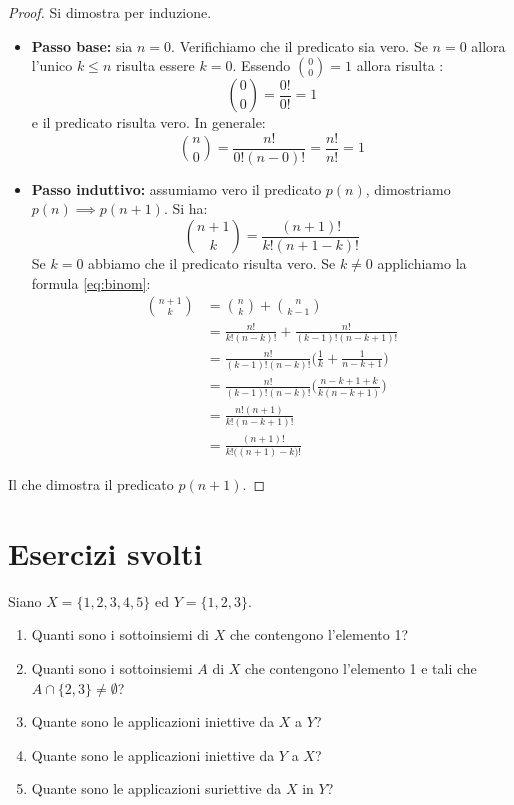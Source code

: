 \begin{proof}
	Si dimostra per induzione.
	\begin{itemize}
		\item \textbf{Passo base:} sia $n=0$. Verifichiamo che il predicato sia vero. Se $n=0$ allora l'unico $k\leq n$ risulta essere $k=0$. Essendo $\binom{0}{0}=1$ allora  risulta :
		\begin{displaymath}
			\binom{0}{0} = \frac{0!}{0!} = 1
		\end{displaymath}
		e il predicato risulta vero. In generale:
		\begin{displaymath}
			\binom{n}{0} = \frac{n!}{0!(n-0)!} = \frac{n!}{n!} = 1
		\end{displaymath}
		\item \textbf{Passo induttivo:} assumiamo vero il predicato $p(n)$, dimostriamo $p(n) \implies p(n+1)$. Si ha:
		\begin{displaymath}
			\binom{n+1}{k} = \frac{(n+1)!}{k!(n+1-k)!}
		\end{displaymath}
		Se $k=0$ abbiamo che il predicato risulta vero. Se $k \neq 0$ applichiamo la formula \ref{eq:binom}:
		\begin{align*}
			\binom{n+1}{k} &= \binom{n}{k} + \binom{n}{k-1}\\
			&= \frac{n!}{k!(n-k)!} + \frac{n!}{(k-1)!(n-k+1)!}\\
			&= \frac{n!}{(k-1)!(n-k)!} \bigl(\frac{1}{k}+ \frac{1}{n-k+1}\bigr)\\
			&= \frac{n!}{(k-1)!(n-k)!} \bigl(\frac{n-k+1 +k}{k(n-k+1)}\bigr) \\
			&= \frac{n!(n+1)}{k!(n-k+1)!}\\
			&= \frac{(n+1)!}{k!\bigl((n+1)-k\bigr)!}
		\end{align*}
	\end{itemize}
	Il che dimostra il predicato $p(n+1)$.
\end{proof}
\newpage
\section{Esercizi svolti}
\begin{exsbox}
	Siano $X = \{1,2,3,4,5\}$ ed $Y=\{1,2,3\}$.
	\begin{enumerate}
		\item Quanti sono i sottoinsiemi di $X$ che contengono l'elemento 1?
		\item Quanti sono i sottoinsiemi $A$ di $X$ che contengono l'elemento 1 e tali che $A \cap \{2,3\} \neq \emptyset$?
		\item Quante sono le applicazioni iniettive da $X$ a $Y$?
		\item Quante sono le applicazioni iniettive da $Y$ a $X$?
		\item Quante sono le applicazioni suriettive da $X$ in $Y$?
	\end{enumerate}
\end{exsbox}
